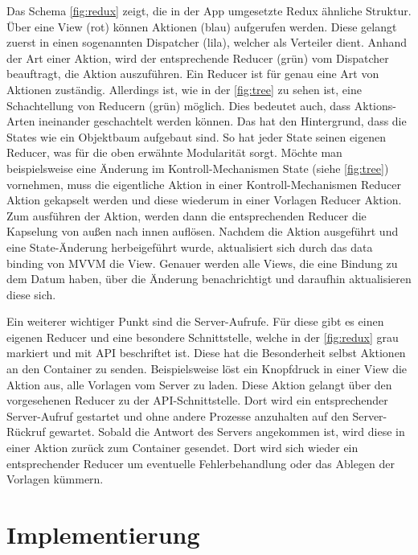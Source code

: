\documentclass[notables, nomenclature, oneside, 150]{HSMW-Thesis}
\begin{document}
		Das Schema \ref{fig:redux} zeigt, die in der App umgesetzte Redux ähnliche Struktur. Über eine View (rot) können Aktionen (blau) aufgerufen werden. Diese gelangt zuerst in einen sogenannten Dispatcher (lila), welcher als Verteiler dient. Anhand der Art einer Aktion, wird der entsprechende Reducer (grün) vom Dispatcher beauftragt, die Aktion auszuführen. Ein Reducer ist für genau eine Art von Aktionen zuständig. Allerdings ist, wie in der \autoref{fig:tree} zu sehen ist, eine Schachtellung von Reducern (grün) möglich. Dies bedeutet auch, dass Aktions-Arten ineinander geschachtelt werden können. Das hat den Hintergrund, dass die States wie ein Objektbaum aufgebaut sind. So hat jeder State seinen eigenen Reducer, was für die oben erwähnte Modularität sorgt. Möchte man beispielsweise eine Änderung im Kontroll-Mechanismen State (siehe \ref{fig:tree}) vornehmen, muss die eigentliche Aktion in einer Kontroll-Mechanismen Reducer Aktion gekapselt werden und diese wiederum in einer Vorlagen Reducer Aktion. Zum ausführen der Aktion, werden dann die entsprechenden Reducer die Kapselung von außen nach innen auflösen. Nachdem die Aktion ausgeführt und eine State-Änderung herbeigeführt wurde, aktualisiert sich durch das data binding von MVVM die View. Genauer werden alle Views, die eine Bindung zu dem Datum haben, über die Änderung benachrichtigt und daraufhin aktualisieren diese sich.

		Ein weiterer wichtiger Punkt sind die Server-Aufrufe. Für diese gibt es einen eigenen Reducer und eine besondere Schnittstelle, welche in der \autoref{fig:redux} grau markiert und mit API  beschriftet ist. Diese hat die Besonderheit selbst Aktionen an den Container zu senden. Beispielsweise löst ein Knopfdruck in einer View die Aktion aus, alle Vorlagen vom Server zu laden. Diese Aktion gelangt über den vorgesehenen Reducer zu der API-Schnittstelle. Dort wird ein entsprechender Server-Aufruf gestartet und ohne andere Prozesse anzuhalten auf den Server-Rückruf gewartet. Sobald die Antwort des Servers angekommen ist, wird diese in einer Aktion zurück zum Container gesendet. Dort wird sich wieder ein entsprechender Reducer um eventuelle Fehlerbehandlung oder das Ablegen der Vorlagen kümmern.
		
	\section{Implementierung}\label{sc:implementierung}
		
\end{document}
